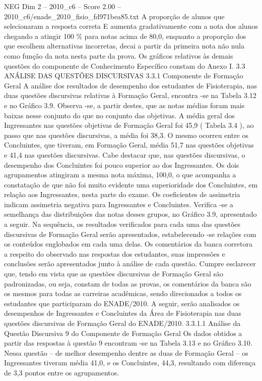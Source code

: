 \begin{textsample}{NEG Dim 2 – 2010\_c6 – Score 2.00 – 2010\_c6/enade\_2010\_fisio\_fd971bea85.txt}
A proporção de alunos que selecionaram a resposta correta E aumenta gradativamente com a nota dos alunos chegando a atingir 100 \% para notas acima de 80,0, enquanto a proporção dos que escolhem alternativas incorretas, decai a partir da primeira nota não nula como função da nota nesta parte da prova.
Os gráficos relativos às demais questões do componente de Conhecimento Específico constam do Anexo I. 3.3 ANÁLISE DAS QUESTÕES DISCURSIVAS 3.3.1 Componente de Formação Geral A análise dos resultados de desempenho dos estudantes de Fisioterapia, nas duas questões discursivas relativas à Formação Geral, encontra -se na Tabela 3.12 e no Gráfico 3.9.
Observa -se, a partir destes, que as notas médias foram mais baixas nesse conjunto do que no conjunto das objetivas.
A média geral dos Ingressantes nas questões objetivas de Formação Geral foi 45,9 ( Tabela 3.4 ), ao passo que nas questões discursivas, a média foi 38,3.
O mesmo ocorreu entre os Concluintes, que tiveram, em Formação Geral, média 51,7 nas questões objetivas e 41,4 nas questões discursivas.
Cabe destacar que, nas questões discursivas, o desempenho dos Concluintes foi pouco superior ao dos Ingressantes.
Os dois agrupamentos atingiram a mesma nota máxima, 100,0, o que acompanha a constatação de que não foi muito evidente uma superioridade dos Concluintes, em relação aos Ingressantes, nesta parte do exame.
Os coeficientes de assimetria indicam assimetria negativa para Ingressantes e Concluintes.
Verifica -se a semelhança das distribuições das notas desses grupos, no Gráfico 3.9, apresentado a seguir.
Na sequência, os resultados verificados para cada uma das questões discursivas de Formação Geral serão apresentados, estabelecendo -se relações com os conteúdos englobados em cada uma delas.
Os comentários da banca corretora a respeito do observado nas respostas dos estudantes, suas impressões e conclusões serão apresentados junto à análise de cada questão.
Cumpre esclarecer que, tendo em vista que as questões discursivas de Formação Geral são padronizadas, ou seja, constam de todas as provas, os comentários da banca são os mesmos para todas as carreiras acadêmicas, sendo direcionados a todos os estudantes que participaram do ENADE/2010.
A seguir, serão analisados os desempenhos de Ingressantes e Concluintes da Área de Fisioterapia nas duas questões discursivas de Formação Geral do ENADE/2010. 3.3.1.1 Análise da Questão Discursiva 9 do Componente de Formação Geral Os dados obtidos a partir das respostas à questão 9 encontram -se na Tabela 3.13 e no Gráfico 3.10.
Nessa questão – de melhor desempenho dentre as duas de Formação Geral – os Ingressantes tiveram média 41,0, e os Concluintes, 44,3, resultando com diferença de 3,3 pontos entre os agrupamentos.

\end{textsample}
